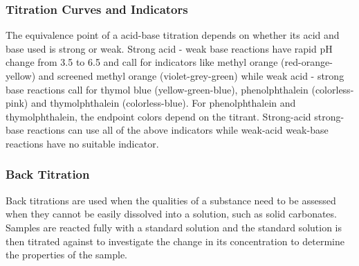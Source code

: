 \documentclass[../main]{subfiles}
\begin{document}




	\subsubsection{Titration Curves and Indicators}


	The equivalence point of a acid-base titration depends on whether its acid and base used is strong or weak. Strong acid - weak base reactions have rapid pH change from 3.5 to 6.5 and call for indicators like methyl orange (red-orange-yellow) and screened methyl orange (violet-grey-green) while weak acid - strong base reactions call for thymol blue (yellow-green-blue), phenolphthalein (colorless-pink) and thymolphthalein (colorless-blue). For phenolphthalein and thymolphthalein, the endpoint colors depend on the titrant. Strong-acid strong-base reactions can use all of the above indicators while weak-acid weak-base reactions have no suitable indicator.

	\subsubsection{Back Titration}

	Back titrations are used when the qualities of a substance need to be assessed when they cannot be easily dissolved into a solution, such as solid carbonates. Samples are reacted fully with a standard solution and the standard solution is then titrated against to investigate the change in its concentration to determine the properties of the sample.
\end{document}
